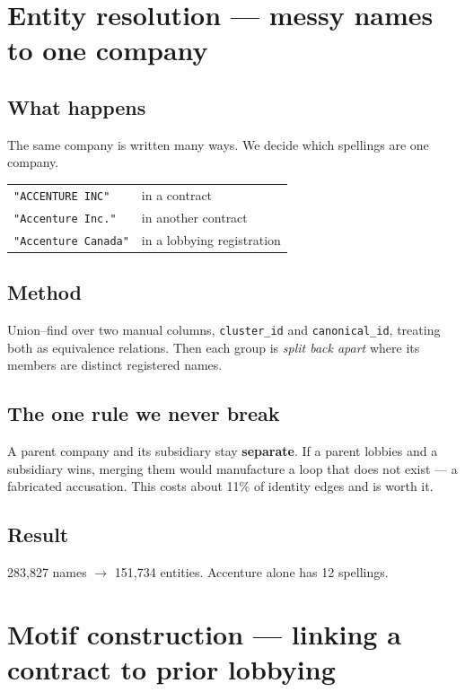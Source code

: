 \documentclass[11pt,a4paper]{article}
\begin{document}
\section{Entity resolution --- messy names to one company}

\subsection*{What happens}
The same company is written many ways. We decide which spellings are one company.

\begin{center}\small
\begin{tabular}{@{}ll@{}}
\toprule
\texttt{"ACCENTURE INC"} & in a contract \\
\texttt{"Accenture Inc."} & in another contract \\
\texttt{"Accenture Canada"} & in a lobbying registration \\
\bottomrule
\end{tabular}
\end{center}

\subsection*{Method}
Union--find over two manual columns, \texttt{cluster\_id} and \texttt{canonical\_id},
treating both as equivalence relations. Then each group is \emph{split back apart} where
its members are distinct registered names.

\subsection*{The one rule we never break}
A parent company and its subsidiary stay \textbf{separate}. If a parent lobbies and a
subsidiary wins, merging them would manufacture a loop that does not exist ---
a fabricated accusation. This costs about 11\% of identity edges and is worth it.

\subsection*{Result}
283{,}827 names $\rightarrow$ 151{,}734 entities. Accenture alone has 12 spellings.

\section{Motif construction --- linking a contract to prior lobbying}
\end{document}
